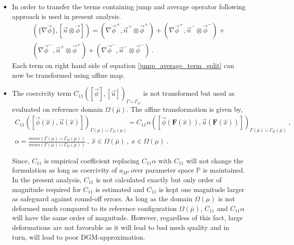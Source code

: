 \documentclass[graybox]{svmult}
\begin{document}
\begin{itemize}
\item In order to transfer the terms containing jump and average operator following approach is used in present analysis.
\begin{equation*}\label{jump_average_term_split}
\begin{split}
\left(\lbrace \nabla \overrightarrow{\phi} \rbrace , \left[ \overrightarrow{n} \otimes \overrightarrow{\phi}  \right]  \right) = \left( \nabla \overrightarrow{\phi}^+ , \overrightarrow{n}^+ \otimes \overrightarrow{\phi}^+ \right) + \left( \nabla \overrightarrow{\phi}^+ , \overrightarrow{n}^- \otimes \overrightarrow{\phi}^- \right) + \\ 
\left( \nabla \overrightarrow{\phi}^- , \overrightarrow{n}^+ \otimes \overrightarrow{\phi}^+ \right) + \left( \nabla \overrightarrow{\phi}^- , \overrightarrow{n}^- \otimes \overrightarrow{\phi}^- \right) \ .
\end{split}
\end{equation*}
Each term on right hand side of equation \eqref{jump_average_term_split} can now be transformed using affine map.

\item The coercivity term $C_{11}\left( [\overrightarrow{\phi}],[\overrightarrow{u}] \right)_{\Gamma \cup \Gamma_D}$ is not transformed but used as evaluated on reference domain $\Omega(\bar{\mu})$. The affine transformation is given by,
\begin{equation*}
\begin{split}
C_{11}\left( [\overrightarrow{\phi}(\hat{x}),\overrightarrow{u}(\hat{x})] \right)_{\Gamma(\mu) \cup \Gamma_D(\mu)} = C_{11} \alpha \left( [\overrightarrow{\phi}(\bm{F}(\hat{x})),\overrightarrow{u}(\bm{F}(\hat{x}))] \right)_{\Gamma(\bar{\mu}) \cup \Gamma_D(\bar{\mu})} \ , \\
\alpha = \frac{meas\left( \Gamma(\mu) \cup \Gamma_D(\mu)\right)}{meas\left( \Gamma(\bar{\mu}) \cup \Gamma_D(\bar{\mu})\right)} \ , \ \hat{x} \in \Omega(\bar{\mu}) \ , \ x \in \Omega(\mu) \ .
\end{split}
\end{equation*}

Since, $C_{11}$ is empirical coefficient replacing $C_{11} \alpha$ with $C_{11}$ will not change the formulation as long as coercivity of $a_{IP}$ over parameter space $\mathbb{P}$ is maintained. In the present analysis, $C_{11}$ is not calculated exactly but only order of magnitude required for $C_{11}$ is estimated and $C_{11}$ is kept one magnitude larger as safeguard against round-off errors. As long as the domain $\Omega(\mu)$ is not deformed much compared to its reference configuration $\Omega(\bar{\mu})$, $C_{11}$ and $C_{11}\alpha$ will have the same order of magnitude. However, regardless of this fact, large deformations are not favorable as it will lead to bad mesh quality and in turn, will lead to poor DGM-approximation.
\end{itemize}
\end{document}
